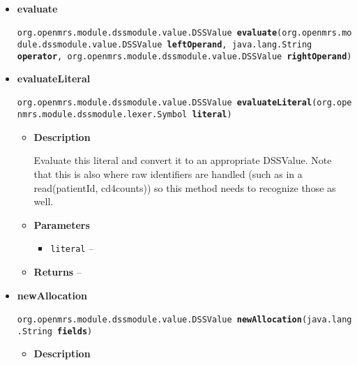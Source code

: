 {{{\begin{itemize}
{\begin{itemize}
{}%
\end{itemize}
}%
\item{ 
\hypertarget{org.openmrs.module.dssmodule.state.Evaluator.evaluate(org.openmrs.module.dssmodule.value.DSSValue, java.lang.String, org.openmrs.module.dssmodule.value.DSSValue)}{{\bf  evaluate}\\}
\texttt{ org.openmrs.module.dssmodule.value.DSSValue\ {\bf  evaluate}(\texttt{org.openmrs.module.dssmodule.value.DSSValue} {\bf  leftOperand},
\texttt{java.lang.String} {\bf  operator},
\texttt{org.openmrs.module.dssmodule.value.DSSValue} {\bf  rightOperand})
\label{org.openmrs.module.dssmodule.state.Evaluator.evaluate(org.openmrs.module.dssmodule.value.DSSValue, java.lang.String, org.openmrs.module.dssmodule.value.DSSValue)}}%
}%
\item{ 
\hypertarget{org.openmrs.module.dssmodule.state.Evaluator.evaluateLiteral(org.openmrs.module.dssmodule.lexer.Symbol)}{{\bf  evaluateLiteral}\\}
\texttt{ org.openmrs.module.dssmodule.value.DSSValue\ {\bf  evaluateLiteral}(\texttt{org.openmrs.module.dssmodule.lexer.Symbol} {\bf  literal})
\label{org.openmrs.module.dssmodule.state.Evaluator.evaluateLiteral(org.openmrs.module.dssmodule.lexer.Symbol)}}%
\begin{itemize}
\item{
{\bf  Description}

Evaluate this literal and convert it to an appropriate DSSValue. Note that this is also where raw identifiers are handled (such as in a read(patientId, cd4counts)) so this method needs to recognize those as well.
}
\item{
{\bf  Parameters}
  \begin{itemize}
   \item{
\texttt{literal} -- }
  \end{itemize}
}%
\item{{\bf  Returns} -- 
 
}%
\end{itemize}
}%
\item{ 
\hypertarget{org.openmrs.module.dssmodule.state.Evaluator.newAllocation(java.lang.String[])}{{\bf  newAllocation}\\}
\texttt{ org.openmrs.module.dssmodule.value.DSSValue\ {\bf  newAllocation}(\texttt{java.lang.String\lbrack \rbrack } {\bf  fields})
\label{org.openmrs.module.dssmodule.state.Evaluator.newAllocation(java.lang.String[])}}%
\begin{itemize}
\item{
{\bf  Description}

}
\end{itemize}}
\end{itemize}}}}
